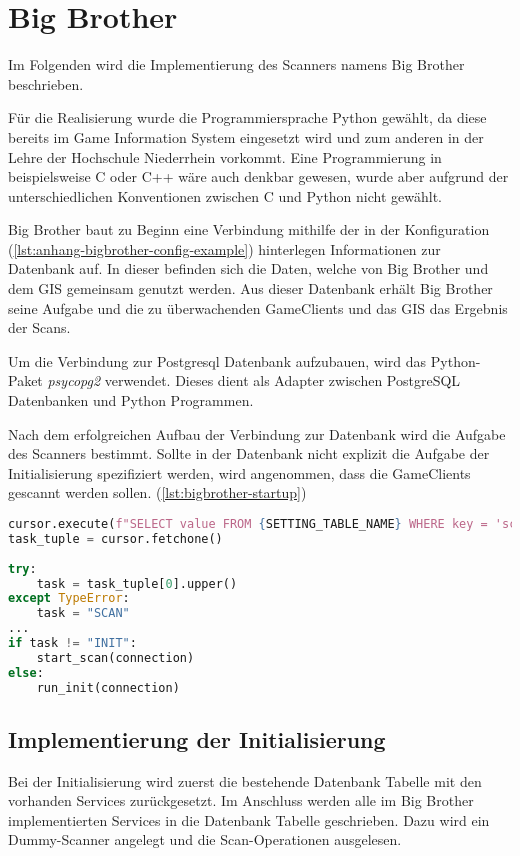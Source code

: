 \section{Big Brother}

Im Folgenden wird die Implementierung des Scanners namens Big Brother beschrieben.

Für die Realisierung wurde die Programmiersprache Python gewählt, da diese bereits im Game Information System eingesetzt wird und zum anderen in der Lehre der Hochschule Niederrhein vorkommt. Eine Programmierung in beispielsweise C oder C++ wäre auch denkbar gewesen, wurde aber aufgrund der unterschiedlichen Konventionen zwischen C und Python nicht gewählt.

Big Brother baut zu Beginn eine Verbindung mithilfe der in der Konfiguration (\autoref{lst:anhang-bigbrother-config-example}) hinterlegen Informationen zur Datenbank auf. In dieser befinden sich die Daten, welche von Big Brother und dem GIS gemeinsam genutzt werden. Aus dieser Datenbank erhält Big Brother seine Aufgabe und die zu überwachenden GameClients und das GIS das Ergebnis der Scans.

Um die Verbindung zur Postgresql Datenbank aufzubauen, wird das Python-Paket \textit{psycopg2} verwendet. Dieses dient als Adapter zwischen PostgreSQL Datenbanken und Python Programmen. 

Nach dem erfolgreichen Aufbau der Verbindung zur Datenbank wird die Aufgabe des Scanners bestimmt. Sollte in der Datenbank nicht explizit die Aufgabe der Initialisierung spezifiziert werden, wird angenommen, dass die GameClients gescannt werden sollen. (\ref{lst:bigbrother-startup})

\begin{lstlisting}[language=Python, frame=single, caption={Aufgabe des Scanners}, captionpos=b, label={lst:bigbrother-startup}]
cursor.execute(f"SELECT value FROM {SETTING_TABLE_NAME} WHERE key = 'scanner.task'")
task_tuple = cursor.fetchone()
	
try:
	task = task_tuple[0].upper()
except TypeError:
	task = "SCAN"
...
if task != "INIT":
	start_scan(connection)
else:
	run_init(connection)	
\end{lstlisting}


\subsection{Implementierung der Initialisierung}

Bei der Initialisierung wird zuerst die bestehende Datenbank Tabelle mit den vorhanden Services zurückgesetzt.
Im Anschluss werden alle im Big Brother implementierten Services in die Datenbank Tabelle geschrieben. Dazu wird ein Dummy-Scanner angelegt und die Scan-Operationen ausgelesen.

